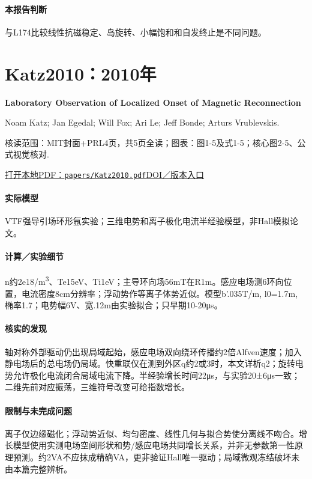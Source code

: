 \paragraph{本报告判断}与L174比较线性抗磁稳定、岛旋转、小幅饱和和自发终止是不同问题。

\section{Katz2010：2010年}\label{paper:Katz2010}

\textbf{Laboratory Observation of Localized Onset of Magnetic Reconnection}\citep{Katz2010}\

Noam Katz;  Jan Egedal;  Will Fox;  Ari Le;  Jeff Bonde;  Arturs Vrublevskis.

\textsf{核读范围：}MIT封面+PRL4页，共5页全读；\textsf{图表：}图1-5及式1-5；核心图2-5、公式视觉核对.

\href{run:papers/Katz2010.pdf}{打开本地PDF：\texttt{papers/Katz2010.pdf}}\quad\href{https://doi.org/10.1103/physrevlett.104.255004}{DOI／版本入口}

\paragraph{实际模型}VTF强导引场环形氩实验；三维电势和离子极化电流半经验模型，非Hall模拟论文。

\paragraph{计算／实验细节}n约2e18/m\textsuperscript{3}、Te15eV、Ti1eV；主导环向场56mT在R1m。感应电场测6环向位置，电流密度8cm分辨率；浮动势作等离子体势近似。模型b'.035T/m, l0=1.7m, 椭率1.7；电势幅6V、宽.12m由实验拟合；只早期10-20μs。

\paragraph{核实的发现}轴对称外部驱动仍出现局域起始，感应电场双向绕环传播约2倍Alfven速度；加入静电场后的总电场仍局域。快重联仅在测到外区q约2或3时，本文详析q2；旋转电势允许极化电流闭合局域电流下降。半经验增长时间22μs，与实验20±6μs一致；二维先前对应振荡，三维符号改变可给指数增长。

\paragraph{限制与未完成问题}离子仅边缘磁化；浮动势近似、均匀密度、线性几何与拟合势使分离线不吻合。增长模型使用实测电场空间形状和势/感应电场共同增长关系，并非无参数第一性原理预测。约2VA不应抹成精确VA，更非验证Hall唯一驱动；局域微观冻结破坏未由本篇完整辨析。

